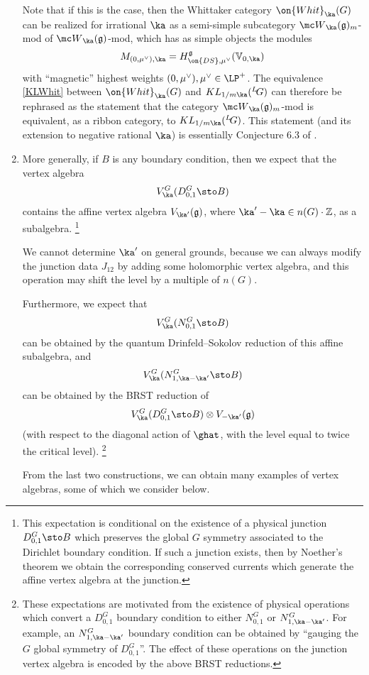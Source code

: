 \documentclass[11pt,reqno]{amsart}
\theoremstyle{plain}
\numberwithin{equation}{section}
\newcommand{\Z}{\mathbb{Z}}
\newcommand{\g}{\mathfrak{g}}
\def\neg{\negthinspace}
\def\LG{{}^L\neg G}
\theoremstyle{definition}
\begin{document}
\begin{enumerate}
Note that if this is the case, then the Whittaker category
$\on{Whit}_{\ka}(G)$ can be realized for irrational $\ka$ as a
semi-simple subcategory ${\mc W}_\ka(\g)_m$-mod of ${\mc
  W}_\ka(\g)$-mod, which has as simple objects the modules
$$
M_{(0,\mu^\vee),\ka} =
H^{\g}_{\on{DS},\mu^\vee}({\mathbb V}_{0,\ka})
$$
with ``magnetic'' highest weights $(0,\mu^\vee), \mu^\vee \in
\LP^+$. The equivalence \eqref{KLWhit} between $\on{Whit}_{\ka}(G)$
and $KL_{1/m\ka}(\LG)$ can therefore be rephrased as the statement
that the category ${\mc W}_\ka(\g)_m$-mod is equivalent, as a ribbon
category, to $KL_{1/m\ka}(\LG)$. This statement (and its extension to
negative rational $\ka$) is essentially Conjecture 6.3 of
\cite{AFO}.

\bigskip

\item More generally, if $B$ is any boundary condition, then we expect
  that the vertex algebra
$$
V^G_\ka(D^G_{0,1}\sto B)
$$
contains the affine vertex algebra $V_{\ka'}(\g)$, where $\ka' - \ka
\in n(G) \cdot \Z$, as a subalgebra. \footnote{This expectation is
  conditional on the existence of a physical junction $D^G_{0,1}\sto
  B$ which preserves the global $G$ symmetry associated to the
  Dirichlet boundary condition. If such a junction exists, then by
  Noether's theorem we obtain the corresponding conserved currents
  which generate the affine vertex algebra at the junction.}

We cannot determine $\ka'$ on general grounds, because we can always modify the junction data
$J_{12}$ by adding some holomorphic vertex algebra, and this operation
may shift the level by a multiple of $n(G)$.

Furthermore, we expect that
$$
V^G_\ka(N^G_{0,1}\sto B)
$$
can be obtained by the quantum Drinfeld--Sokolov reduction of this
affine subalgebra, and
$$
V^G_\ka(N^G_{1,\ka-\ka'}\sto B)
$$
can be obtained by the BRST reduction of
$$
V^G_\ka(D^G_{0,1}\sto B) \otimes V_{-\ka'}(\g)
$$
(with respect to the diagonal action of $\ghat$, with the level equal
to twice the critical level). \footnote{These expectations are motivated from the existence of physical operations which convert a 
$D^G_{0,1}$ boundary condition to either $N^G_{0,1}$ or $N^G_{1,\ka-\ka'}$. For example, an $N^G_{1,\ka-\ka'}$
boundary condition can be obtained by ``gauging the $G$ global symmetry of $D^G_{0,1}$''. 
The effect of these operations on the junction vertex algebra is encoded by the above BRST reductions. }

From the last two constructions, we can obtain many examples of vertex
algebras, some of which we consider below.


\end{enumerate}
\end{document}

